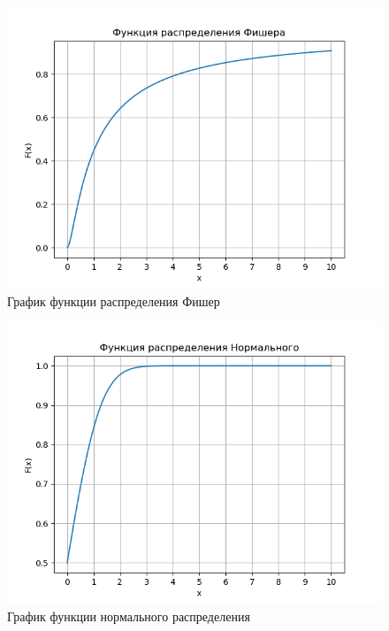 \documentclass[a4]{article}
\begin{document}
\begin{center}
\begin{figure}[H]
\caption{График функции распределения Фишер}
\includegraphics[width=\textwidth]{output/task1/fisher_chart.png}
\end{figure}

\begin{figure}[H]
\caption{График функции нормального распределения}
\includegraphics[width=\textwidth]{output/task1/norm_chart.png}
\end{figure}

\end{center}
\end{document}

